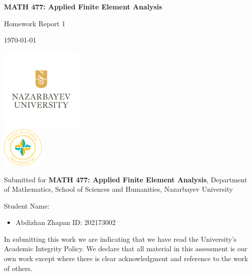 \documentclass[12pt, a4paper]{article}
\begin{document}
\begin{titlepage}
    \centering

    \vspace*{0.5cm}
    {\Large\bfseries MATH 477: Applied Finite Element Analysis\par}

    \vspace{1cm}
    {\large Homework Report 1\par}

    \vspace{0.5cm}
    {\today\par}

    \vspace{1pt}
    \includegraphics[width=0.3\textwidth]{NU-logo.png}\\
    \includegraphics[width=0.15\textwidth]{sosah-logo.png}

    \vspace{0.5cm}
    Submitted for {\bf MATH 477: Applied Finite Element Analysis}, Department of Mathematics, School of Sciences and Humanities, Nazarbayev University

    \vspace{0.5cm}
    {\large Student Name:\par}
    \begin{itemize}[leftmargin=5cm,rightmargin=4cm]
        \item  Abdizhan Zhapan  ID: 202173002
    \end{itemize}

    \vspace{0.5cm}

    \vspace{0.5cm}
    {\footnotesize In submitting this work we are indicating
    that we have read the University's Academic Integrity Policy. We
    declare that all material in this assessment is our own work except
    where there is clear acknowledgment and reference to the work of
    others.\par}
\end{titlepage}
\end{document}
